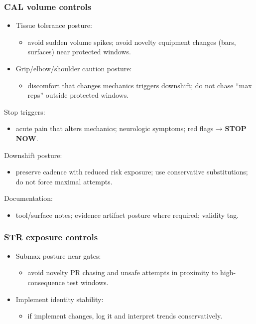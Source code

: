 \documentclass[10pt]{article}
\begin{document}
\subsubsection*{\textbf{CAL} volume controls}

\begin{itemize}
\item Tissue tolerance posture:
\begin{itemize}
\item avoid sudden volume spikes; avoid novelty equipment changes (bars, surfaces) near protected windows.
\end{itemize}
\item Grip/elbow/shoulder caution posture:
\begin{itemize}
\item discomfort that changes mechanics triggers downshift; do not chase “max reps” outside protected windows.
\end{itemize}
\end{itemize}

Stop triggers:

\begin{itemize}
\item acute pain that alters mechanics; neurologic symptoms; red flags → \textbf{STOP} \textbf{NOW}.
\end{itemize}

Downshift posture:

\begin{itemize}
\item preserve cadence with reduced risk exposure; use conservative substitutions; do not force maximal attempts.
\end{itemize}

Documentation:

\begin{itemize}
\item tool/surface notes; evidence artifact posture where required; validity tag.
\end{itemize}

\subsubsection*{\textbf{STR} exposure controls}

\begin{itemize}
\item Submax posture near gates:
\begin{itemize}
\item avoid novelty PR chasing and unsafe attempts in proximity to high-consequence test windows.
\end{itemize}
\item Implement identity stability:
\begin{itemize}
\item if implement changes, log it and interpret trends conservatively.
\end{itemize}
\end{itemize}
\end{document}
